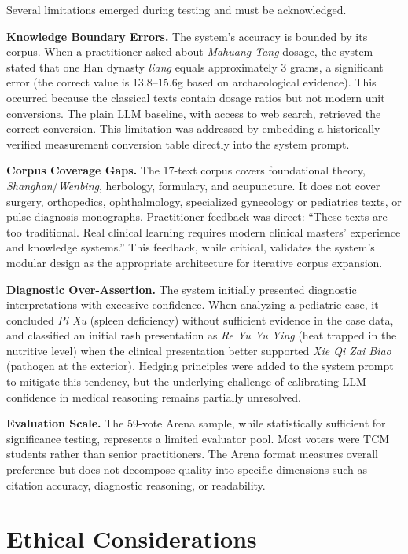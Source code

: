 Several limitations emerged during testing and must be acknowledged.

\textbf{Knowledge Boundary Errors.} The system's accuracy is bounded by its corpus. When a practitioner asked about \textit{Mahuang Tang} dosage, the system stated that one Han dynasty \textit{liang} equals approximately 3 grams, a significant error (the correct value is 13.8--15.6g based on archaeological evidence). This occurred because the classical texts contain dosage ratios but not modern unit conversions. The plain LLM baseline, with access to web search, retrieved the correct conversion. This limitation was addressed by embedding a historically verified measurement conversion table directly into the system prompt.

\textbf{Corpus Coverage Gaps.} The 17-text corpus covers foundational theory, \textit{Shanghan}/\textit{Wenbing}, herbology, formulary, and acupuncture. It does not cover surgery, orthopedics, ophthalmology, specialized gynecology or pediatrics texts, or pulse diagnosis monographs. Practitioner feedback was direct: ``These texts are too traditional. Real clinical learning requires modern clinical masters' experience and knowledge systems.'' This feedback, while critical, validates the system's modular design as the appropriate architecture for iterative corpus expansion.

\textbf{Diagnostic Over-Assertion.} The system initially presented diagnostic interpretations with excessive confidence. When analyzing a pediatric case, it concluded \textit{Pi Xu} (spleen deficiency) without sufficient evidence in the case data, and classified an initial rash presentation as \textit{Re Yu Yu Ying} (heat trapped in the nutritive level) when the clinical presentation better supported \textit{Xie Qi Zai Biao} (pathogen at the exterior). Hedging principles were added to the system prompt to mitigate this tendency, but the underlying challenge of calibrating LLM confidence in medical reasoning remains partially unresolved.

\textbf{Evaluation Scale.} The 59-vote Arena sample, while statistically sufficient for significance testing, represents a limited evaluator pool. Most voters were TCM students rather than senior practitioners. The Arena format measures overall preference but does not decompose quality into specific dimensions such as citation accuracy, diagnostic reasoning, or readability.

\section{Ethical Considerations}

